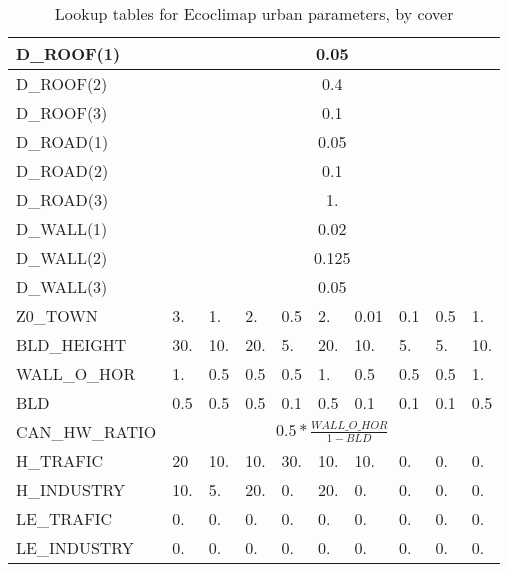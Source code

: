 \begin{table}[htbp]
\begin{center}
\begin{tabular}{|l|l|l|l|l|l|l|l|l|l| }
\hline
D\_ROOF(1) &  \multicolumn{9}{|c|}{0.05} \\
\hline
D\_ROOF(2) &  \multicolumn{9}{|c|}{0.4} \\
\hline
D\_ROOF(3) &  \multicolumn{9}{|c|}{0.1} \\
\hline
D\_ROAD(1) &  \multicolumn{9}{|c|}{0.05} \\
\hline
D\_ROAD(2) &  \multicolumn{9}{|c|}{0.1} \\
\hline
D\_ROAD(3) &  \multicolumn{9}{|c|}{1.} \\
\hline
D\_WALL(1) &  \multicolumn{9}{|c|}{0.02} \\
\hline
D\_WALL(2) &  \multicolumn{9}{|c|}{0.125} \\
\hline
D\_WALL(3) &  \multicolumn{9}{|c|}{0.05} \\
\hline
Z0\_TOWN & 3. & 1. & 2. & 0.5 & 2. & 0.01 & 0.1 & 0.5 & 1. \\
\hline 
BLD\_HEIGHT & 30. & 10. & 20. & 5. & 20. & 10. & 5. & 5. & 10. \\
\hline
WALL\_O\_HOR & 1. & 0.5 & 0.5 & 0.5 & 1. & 0.5 & 0.5 & 0.5 & 1. \\
\hline
BLD & 0.5 & 0.5 & 0.5 & 0.1 & 0.5 & 0.1 & 0.1 & 0.1 & 0.5 \\
\hline
CAN\_HW\_RATIO & \multicolumn{9}{|c|}{$0.5*\frac{WALL\_O\_HOR}{1-BLD}$} \\
\hline
H\_TRAFIC & 20 & 10. & 10. & 30. & 10. & 10. & 0. & 0. & 0. \\
\hline
H\_INDUSTRY & 10. & 5. & 20. & 0. & 20. & 0. & 0. & 0. & 0. \\
\hline
LE\_TRAFIC & 0. & 0. & 0. & 0. & 0. & 0. & 0. & 0. & 0. \\
\hline
LE\_INDUSTRY & 0. & 0. & 0. & 0. & 0. & 0. & 0. & 0. & 0. \\
\hline
\end{tabular}
\end{center}
\caption{Lookup tables for Ecoclimap urban parameters, by cover}
\label{tab6}
\end{table}

